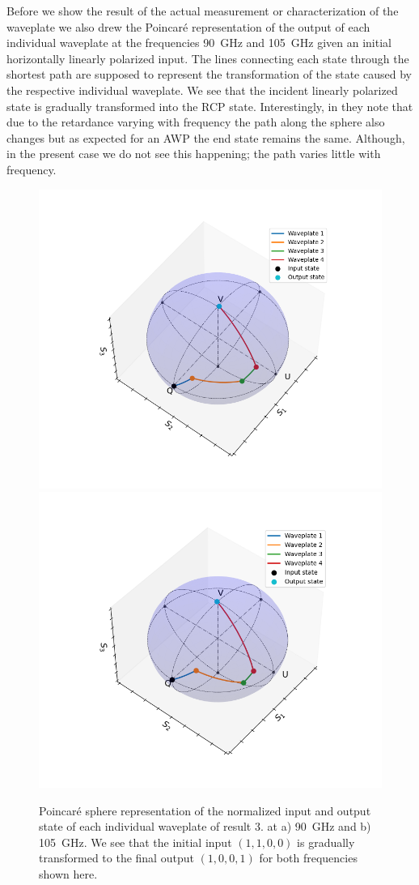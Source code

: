Before we show the result of the actual measurement or characterization of the waveplate we also drew the Poincaré representation of the output of each individual waveplate at the frequencies \SI{90}{\giga \hertz} and \SI{105}{\giga \hertz} given an initial horizontally linearly polarized input. The lines connecting each state through the shortest path are supposed to represent the transformation of the state caused by the respective individual waveplate. We see that the incident linearly polarized state is gradually transformed into the RCP state. Interestingly, in \cite{Masson2006} they note that due to the retardance varying with frequency the path along the sphere also changes but as expected for an AWP the end state remains the same. Although, in the present case we do not see this happening; the path varies little with frequency. 

\begin{figure}[H]
    \centering
    \subcaptionbox{\label{fig:res3_poincare_90ghz}}
        {\includegraphics[width=0.47\linewidth]{images/5_chapter05/plots/polymer/poincare/Poincare_Res3_90GHz.png}}
    \subcaptionbox{\label{fig:res3_poincare_105ghz}}
        {\includegraphics[width=0.47\linewidth]{images/5_chapter05/plots/polymer/poincare/Poincare_Res3_105GHz.png}}
    \caption{Poincaré sphere representation of the normalized input and output state of each individual waveplate of result 3. at a) \SI{90}{\giga \hertz} and b) \SI{105}{\giga \hertz}. We see that the initial input $(1,1,0,0)$ is gradually transformed to the final output $(1,0,0,1)$ for both frequencies shown here.}
    \label{fig:res3_poincare}
\end{figure}

